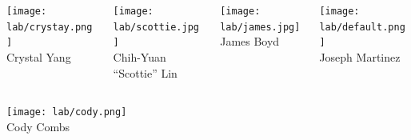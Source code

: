 \begin{frame}[c]{}
\begin{columns}[t]
\begin{column}[T]{3.5in}
\begin{columns}[t]
				
				
				
			\end{columns}
			
			\vspace{.1in}
			
			\begin{columns}[t]
			
				\begin{column}[T]{1in}
					{\centering
						\texttt{[image: lab/crystay.png]} \\
						\vspace{-.1in}
						{\tiny Crystal Yang} \\
						\par
					}
				\end{column}
			
				\begin{column}[T]{1in}
					{\centering
						\texttt{[image: lab/scottie.jpg]} \\
						\vspace{-.1in}
						{\tiny Chih-Yuan ``Scottie'' Lin} \\
						\par
					}
				\end{column}
			
				\begin{column}[T]{1in}
					{\centering
						\texttt{[image: lab/james.jpg]} \\
						\vspace{-.1in}
						{\tiny James Boyd} \\
						\par
					}
				\end{column}
			
				\begin{column}[T]{1in}
					{\centering
						\texttt{[image: lab/default.png]} \\
						\vspace{-.1in}
						{\tiny Joseph Martinez} \\
						\par
					}
				\end{column}
				
				
			\end{columns}
			
			\vspace{.1in}
			
			\begin{columns}[t]
				
				\begin{column}[T]{1in}
					{\centering
						\texttt{[image: lab/cody.png]} \\
						\vspace{-.1in}
						{\tiny Cody Combs} \\
						\par
					}
				\end{column}
			

\end{columns}
\end{column}
\end{columns}
\end{frame}

